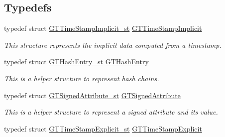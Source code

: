 \subsection*{Typedefs}
\begin{DoxyCompactItemize}
\item 
\hypertarget{group__verification_ga8249a216b7eb29f9e91cb5c01365741e}{
typedef struct \hyperlink{struct_g_t_time_stamp_implicit__st}{GTTimeStampImplicit\_\-st} \hyperlink{group__verification_ga8249a216b7eb29f9e91cb5c01365741e}{GTTimeStampImplicit}}
\label{group__verification_ga8249a216b7eb29f9e91cb5c01365741e}

\begin{DoxyCompactList}\small\item\em This structure represents the implicit data computed from a timestamp. \item\end{DoxyCompactList}\item 
\hypertarget{group__verification_ga95f30dc6daa4bd78d637c404c1d0cfa5}{
typedef struct \hyperlink{struct_g_t_hash_entry__st}{GTHashEntry\_\-st} \hyperlink{group__verification_ga95f30dc6daa4bd78d637c404c1d0cfa5}{GTHashEntry}}
\label{group__verification_ga95f30dc6daa4bd78d637c404c1d0cfa5}

\begin{DoxyCompactList}\small\item\em This is a helper structure to represent hash chains. \item\end{DoxyCompactList}\item 
\hypertarget{group__verification_gae2a2597c391b8d36404081ca98a27529}{
typedef struct \hyperlink{struct_g_t_signed_attribute__st}{GTSignedAttribute\_\-st} \hyperlink{group__verification_gae2a2597c391b8d36404081ca98a27529}{GTSignedAttribute}}
\label{group__verification_gae2a2597c391b8d36404081ca98a27529}

\begin{DoxyCompactList}\small\item\em This is a helper structure to represent a signed attribute and its value. \item\end{DoxyCompactList}\item 
\hypertarget{group__verification_ga0f0e3ec7bdbfdcc9e376a73db6f8364c}{
typedef struct \hyperlink{struct_g_t_time_stamp_explicit__st}{GTTimeStampExplicit\_\-st} \hyperlink{group__verification_ga0f0e3ec7bdbfdcc9e376a73db6f8364c}{GTTimeStampExplicit}}
\label{group__verification_ga0f0e3ec7bdbfdcc9e376a73db6f8364c}


\end{DoxyCompactItemize}
